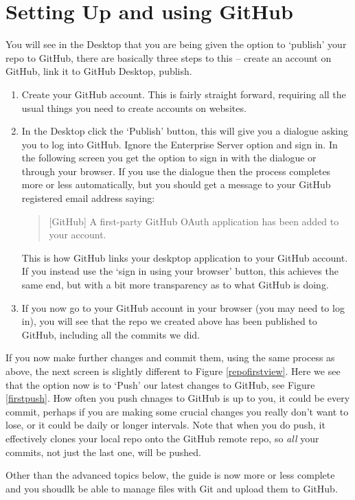\documentclass[a4paper, 12pt]{article}
\begin{document}
\section{Setting Up and using GitHub}
You will see in the Desktop that you are being given the option to `publish' your repo to GitHub, there are basically three steps to this -- create an account on GitHub, link it to GitHub Desktop, publish.
\begin{enumerate}
\item Create your GitHub account. This is fairly straight forward, requiring all the usual things you need to create accounts on websites.
\item In the Desktop click the `Publish' button, this will give you a dialogue asking you to log into GitHub. Ignore the Enterprise Server option and sign in. In the following screen you get the option to sign in with the dialogue or through your browser. If you use the dialogue then the process completes more or less automatically, but you should get a message to your GitHub registered email address saying:
\begin{quote}
[GitHub] A first-party GitHub OAuth application has been added to your account.
\end{quote}
This is how GitHub links your deskptop application to your GitHub account. If you instead use the `sign in using your browser' button, this achieves the same end, but with a bit more transparency as to what GitHub is doing.
\item If you now go to your GitHub account in your browser (you may need to log in), you will see that the repo we created above has been published to GitHub, including all the commits we did.
\end{enumerate}
If you now make further changes and commit them, using the same process as above, the next screen is slightly different to Figure \ref{repofirstview}. Here we see that the option now is to `Push' our latest changes to GitHub, see Figure \ref{firstpush}. How often you push chnages to GitHub is up to you, it could be every commit, perhaps if you are making some crucial changes you really don't want to lose, or it could be daily or longer intervals. Note that when you do push, it effectively clones your local repo onto the GitHub remote repo, so \textit{all} your commits, not just the last one, will be pushed.

Other than the advanced topics below, the guide is now more or less complete and you shoudlk be able to manage files with Git and upload them to GitHub.
\end{document}
